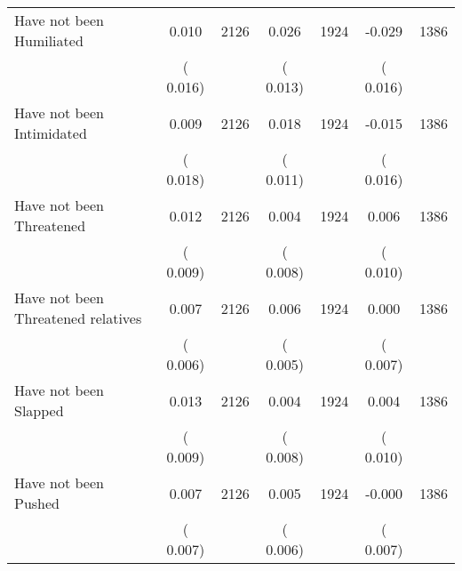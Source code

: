 \begin{tabular}{l*{6}{c}}
Have not been Humiliated        &              0.010      &       2126       &              0.026      &       1924       &             -0.029      &       1386       \\
                       &       (       0.016)            &                               &       (       0.013)            &                               &       (       0.016)            &                               \\
Have not been Intimidated        &              0.009      &       2126       &              0.018      &       1924       &             -0.015      &       1386       \\
                       &       (       0.018)            &                               &       (       0.011)            &                               &       (       0.016)            &                               \\
Have not been Threatened        &              0.012      &       2126       &              0.004      &       1924       &              0.006      &       1386       \\
                       &       (       0.009)            &                               &       (       0.008)            &                               &       (       0.010)            &                               \\
Have not been Threatened relatives        &              0.007      &       2126       &              0.006      &       1924       &              0.000      &       1386       \\
                       &       (       0.006)            &                               &       (       0.005)            &                               &       (       0.007)            &                               \\
Have not been Slapped        &              0.013      &       2126       &              0.004      &       1924       &              0.004      &       1386       \\
                       &       (       0.009)            &                               &       (       0.008)            &                               &       (       0.010)            &                               \\
Have not been Pushed        &              0.007      &       2126       &              0.005      &       1924       &             -0.000      &       1386       \\
                       &       (       0.007)            &                               &       (       0.006)            &                               &       (       0.007)            &                               \\

\end{tabular}
